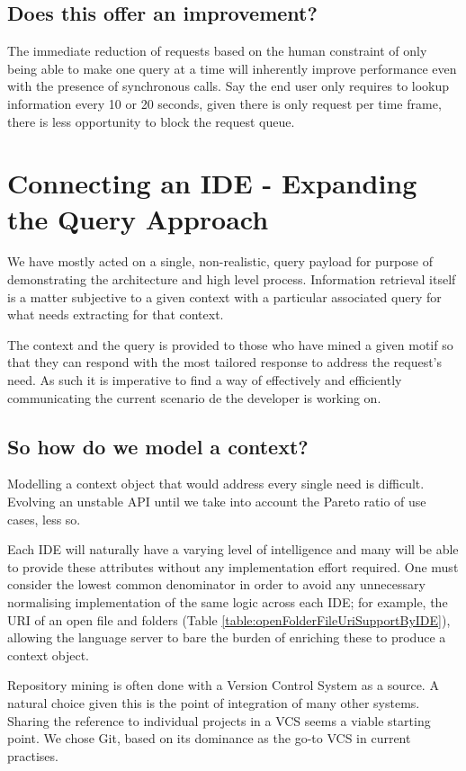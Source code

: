\subsection{Does this offer an improvement?}

The immediate reduction of requests based on the human constraint of only being able to make one query at a time will inherently improve performance even with the presence of synchronous calls. Say the end user only requires to lookup information every 10 or 20 seconds, given there is only request per time frame, there is less opportunity to block the request queue.

\section{Connecting an IDE - Expanding the Query Approach}

We have mostly acted on a single, non-realistic, query payload for purpose of demonstrating the architecture and high level process. Information retrieval itself is a matter subjective to a given context with a particular associated query for what needs extracting for that context. 

The context and the query is provided to those who have mined a given motif so that they can respond with the most tailored response to address the request's need. As such it is imperative to find a way of effectively and efficiently communicating the current scenario de the developer is working on.

\subsection{So how do we model a context?}

Modelling a context object that would address every single need is difficult. Evolving an unstable API until we take into account the Pareto ratio of use cases, less so. 

Each IDE will naturally have a varying level of intelligence and many will be able to provide these attributes without any implementation effort required. One must consider the lowest common denominator in order to avoid any unnecessary normalising implementation of the same logic across each IDE; for example, the URI of an open file and folders (Table \ref{table:openFolderFileUriSupportByIDE}), allowing the language server to bare the burden of enriching these to produce a context object. 

Repository mining is often done with a Version Control System as a source. A natural choice given this is the point of integration of many other systems. Sharing the reference to individual projects in a VCS seems a viable starting  point. We chose Git, based on its dominance as the go-to VCS in current practises. 

